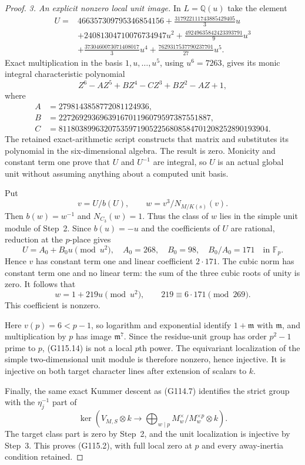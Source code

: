 \begin{proof}
\emph{3. An explicit nonzero local unit image.}
In $L=\mathbb Q(u)$ take the element
\[
\begin{split}
 U={}&466357309795346854156
       +\frac{317922111743885429405}{3}u\\
   &+24081304710076734947u^2
       +\frac{49249635842423393791}{9}u^3\\
   &+\frac{3730460073071408017}{3}u^4
       +\frac{7629317537790237701}{27}u^5.
\end{split}
 \tag{G115.10}
\]
Exact multiplication in the basis $1,u,\ldots,u^5$, using
$u^6=7263$, gives its monic integral characteristic polynomial
\[
 Z^6-AZ^5+BZ^4-CZ^3+BZ^2-AZ+1,
 \tag{G115.11}
\]
where
\[
\begin{split}
 A&=2798143858772081124936,\\
 B&=2272692936963916701196079597387551887,\\
 C&=811803899632075359719052256808584701208252890193904.
\end{split}
\]
The retained exact-arithmetic script constructs that matrix
and substitutes its polynomial in the six-dimensional algebra.
The result is zero.  Monicity and constant term one prove that
$U$ and $U^{-1}$ are integral, so $U$ is an actual global unit
without assuming anything about a computed unit basis.

Put
\[
                   v=U/b(U),\qquad
                   w=v^3/N_{M/K(s)}(v).
 \tag{G115.12}
\]
Then $b(w)=w^{-1}$ and $N_{C_3}(w)=1$.
Thus the class of $w$ lies in the simple unit module of Step~2.
Since $b(u)=-u$ and the coefficients of $U$ are rational,
reduction at the $p$-place gives
\[
 U=A_0+B_0u\pmod{u^2},\quad
 A_0=268,\quad B_0=98,\quad B_0/A_0=171
                               \quad\text{in }\mathbb F_p.
 \tag{G115.13}
\]
Hence $v$ has constant term one and linear coefficient
$2\cdot171$.  The cubic norm has constant term one and no
linear term: the sum of the three cubic roots of unity is zero.
It follows that
\[
                    w=1+219u\pmod{u^2},
                  \qquad219\equiv6\cdot171\pmod{269}.
 \tag{G115.14}
\]
This coefficient is nonzero.

Here $v(p)=6<p-1$, so logarithm and exponential identify
$1+\mathfrak m$ with $\mathfrak m$, and multiplication by
$p$ has image $\mathfrak m^7$.
Since the residue-unit group has order $p^2-1$ prime to $p$,
(G115.14) is not a local $p$th power.
The equivariant localization of the simple two-dimensional
unit module is therefore nonzero, hence injective.
It is injective on both target character lines after extension
of scalars to $k$.

Finally, the same exact Kummer descent as (G114.7) identifies
the strict group with the $\eta_j^{-1}$ part of
\[
 \ker\left(V_{M,S}\otimes k\longrightarrow
                      \bigoplus_{w\mid p}M_w^\times/M_w^{\times p}
                                      \otimes k\right).
 \tag{G115.15}
\]
The target class part is zero by Step~2, and the unit localization
is injective by Step~3.  This proves (G115.2), with full local
zero at $p$ and every away-inertia condition retained.
\end{proof}

